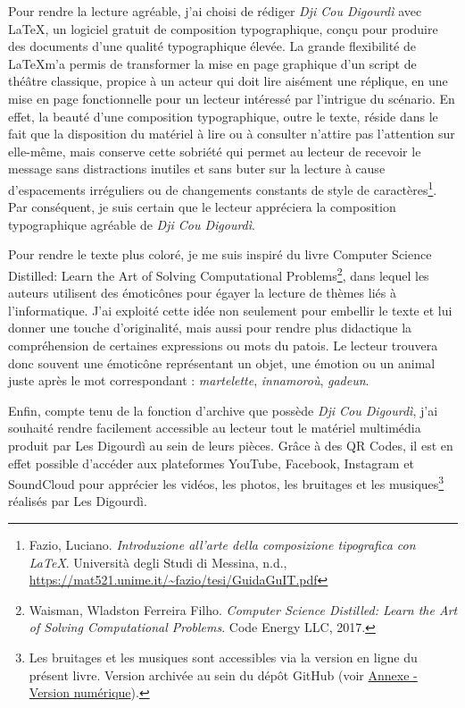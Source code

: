 Pour rendre la lecture agréable, j'ai choisi de rédiger \textit{Dji Cou Digourdì} avec \LaTeX, un logiciel gratuit de composition typographique, conçu pour produire des documents d'une qualité typographique élevée. La grande flexibilité de \LaTeX m'a permis de transformer la mise en page graphique d'un script de théâtre classique, propice à un acteur qui doit lire aisément une réplique, en une mise en page fonctionnelle pour un lecteur intéressé par l'intrigue du scénario. En effet, la beauté d'une composition typographique, outre le texte, réside dans le fait que la disposition du matériel à lire ou à consulter n'attire pas l'attention sur elle-même, mais conserve cette sobriété qui permet au lecteur de recevoir le message sans distractions inutiles et sans buter sur la lecture à cause d'espacements irréguliers ou de changements constants de style de caractères\footnote{ Fazio, Luciano. \textit{Introduzione all'arte della composizione tipografica con LaTeX}. Università degli Studi di Messina, n.d., \url{https://mat521.unime.it/~fazio/tesi/GuidaGuIT.pdf}}. Par conséquent, je suis certain que le lecteur appréciera la composition typographique agréable de \textit{Dji Cou Digourdì}.

Pour rendre le texte plus coloré, je me suis inspiré du livre \og Computer Science Distilled: Learn the Art of Solving Computational Problems\fg\footnote{ Waisman, Wladston Ferreira Filho. \textit{Computer Science Distilled: Learn the Art of Solving Computational Problems}. Code Energy LLC, 2017.}, dans lequel les auteurs utilisent des émoticônes pour égayer la lecture de thèmes liés à l'informatique. J'ai exploité cette idée non seulement pour embellir le texte et lui donner une touche d'originalité, mais aussi pour rendre plus didactique la compréhension de certaines expressions ou mots du patois. Le lecteur trouvera donc souvent une émoticône représentant un objet, une émotion ou un animal juste après le mot correspondant : \textit{martelette}\martello, \textit{innamoroù}\inamourou, \textit{gadeun}\gadeun.

Enfin, compte tenu de la fonction d'archive que possède \textit{Dji Cou Digourdì}, j'ai souhaité rendre facilement accessible au lecteur tout le matériel multimédia produit par Les Digourdì au sein de leurs pièces. Grâce à des QR Codes, il est en effet possible d'accéder aux plateformes YouTube, Facebook, Instagram et SoundCloud pour apprécier les vidéos, les photos, les bruitages et les musiques\footnote{ Les bruitages et les musiques sont accessibles via la version en ligne du présent livre. Version archivée au sein du dépôt GitHub (voir \hyperref[vers_num]{Annexe - Version numérique}).} réalisés par Les Digourdì.

